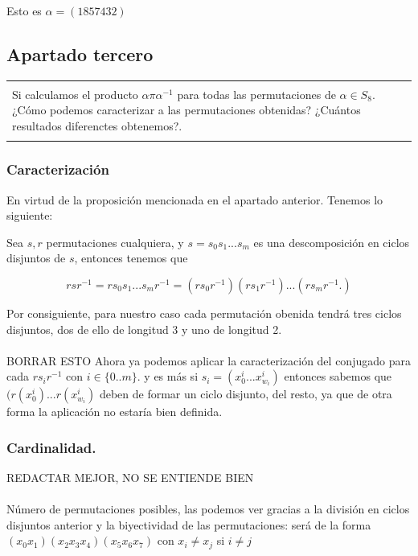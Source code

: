 \documentclass[12pt]{article}
\newenvironment{micaja}
{
    \begin{center}
    \begin{tabular}{|p{0.9\textwidth}|}
    \hline\\
    }   
    {   
    \\\\\hline
    \end{tabular} 
    \end{center}
    }
\begin{document}
Esto es $\alpha = (1 8 5 7 4 3 2)$

\subsection{Apartado tercero}
\begin{micaja}
Si calculamos el producto $\alpha \pi \alpha^{-1}$ para todas las permutaciones de $\alpha \in S_8.$ ¿Cómo podemos caracterizar a las permutaciones obtenidas? ¿Cuántos resultados diferenctes obtenemos?.
\end{micaja}

\subsubsection*{Caracterización}
En virtud de la proposición mencionada en el apartado anterior.
Tenemos lo siguiente:

Sea $s,r$  permutaciones cualquiera, y $s = s_0 s_1 ...  s_m$ es una descomposición en ciclos disjuntos de $s$, entonces tenemos que

$$r s r^{-1} =r s_0 s_1 ...  s_m r^{-1} = (r s_0 r^{-1}) (r s_1 r^{-1}) ... (r s_m r^{-1}.) $$

Por consiguiente, para nuestro caso cada permutación obenida tendrá tres ciclos disjuntos, dos de ello de longitud 3 y uno de longitud 2. 

\paragraph{}
BORRAR ESTO
Ahora ya podemos aplicar la caracterización del conjugado para cada $r s_i r^{-1}$ con $i \in \{0..m\}.$ y es más si
 $s_i = (x_0^i... x_{w_i}^i)$ entonces sabemos que $(r(x_0^i)... r(x_{w_i}^i)$ deben de formar un ciclo disjunto, del resto, 
ya que de otra forma la aplicación no estaría bien definida. 

\subsubsection*{Cardinalidad.}

REDACTAR MEJOR, NO SE ENTIENDE BIEN \paragraph{}

Número de permutaciones posibles, las podemos ver gracias a la división en ciclos disjuntos anterior y la biyectividad de las permutaciones: 
será de la forma $(x_0 x_1)( x_2 x_3 x_4)(x_5 x_6 x_7)$ con $x_i \neq x_j$ si $i \neq j$ 
\end{document}
